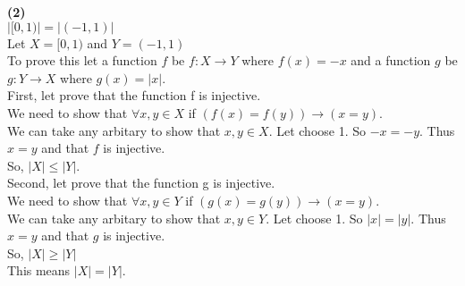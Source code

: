 \documentclass[a4paper, 11pt]{article}
\renewcommand{\part}[1] {\vspace{.10in} {\bf (#1)}}
\begin{document}
\part{2}\\
$|[0,1)| = |(-1,1)|$\\
Let $X = [0,1)$ and $Y = (-1,1)$\\
To prove this let a function $f$ be $f:X\rightarrow Y$ where $f(x) = -x$ and a function $g$ be $g:Y\rightarrow X$ where $g(x) = |x|$.\\
First, let prove that the function f is injective.\\
We need to show that $\forall x,y \in X$ if $(f(x) = f(y)) \rightarrow (x=y)$.\\
We can take any arbitary to show that $x,y \in X$. Let choose 1. So $-x = -y$. Thus $x=y$ and that $f$ is injective.\\
So, $|X| \leq |Y|.$\\
Second, let prove that the function g is injective.\\
We need to show that $\forall x,y \in Y$ if $(g(x) = g(y)) \rightarrow (x=y)$.\\
We can take any arbitary to show that $x,y \in Y$. Let choose 1. So $|x| = |y|$. Thus $x=y$ and that $g$ is injective.\\
So, $|X| \geq |Y|$\\
This means $|X| = |Y|$.
\end{document}
